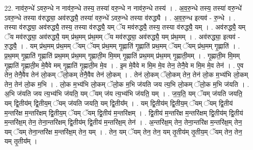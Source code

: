 \documentclass[17pt]{extarticle}
\begin{document}
22. नाव॑रु॒न्धे॑ ऽवरु॒न्धे न नाव॑रु॒न्धे तस्य॒ तस्या॑ वरु॒न्धे न नाव॑रु॒न्धे तस्य॑ । . अ॒व॒रु॒न्धे तस्य॒ तस्या॑ वरु॒न्धे॑ ऽवरु॒न्धे तस्या व॑रुद्ध्या॒ अव॑रुद्ध्यै॒ तस्या॑ वरु॒न्धे॑ ऽवरु॒न्धे तस्या व॑रुद्ध्यै । . अ॒व॒रु॒न्ध इत्यव॑ - रु॒न्धे । . तस्या व॑रुद्ध्या॒ अव॑रुद्ध्यै॒ तस्य॒ तस्या व॑रुद्ध्यै॒ यम् ॅय मव॑रुद्ध्यै॒ तस्य॒ तस्या व॑रुद्ध्यै॒ यम् । . अव॑रुद्ध्यै॒ यम् ॅय मव॑रुद्ध्या॒ अव॑रुद्ध्यै॒ यम् प्र॑थ॒मम् प्र॑थ॒मम् ॅय मव॑रुद्ध्या॒ अव॑रुद्ध्यै॒ यम् प्र॑थ॒मम् । . अव॑रुद्ध्या॒ इत्यव॑ - रु॒द्ध्यै॒ । . यम् प्र॑थ॒मम् प्र॑थ॒मम् ॅयम् ॅयम् प्र॑थ॒मम् गृ॒ह्णाति॑ गृ॒ह्णाति॑ प्रथ॒मम् ॅयम् ॅयम् प्र॑थ॒मम् गृ॒ह्णाति॑ । . प्र॒थ॒मम् गृ॒ह्णाति॑ गृ॒ह्णाति॑ प्रथ॒मम् प्र॑थ॒मम् गृ॒ह्णाती॒म मि॒मम् गृ॒ह्णाति॑ प्रथ॒मम् प्र॑थ॒मम् गृ॒ह्णाती॒मम् । . गृ॒ह्णाती॒म मि॒मम् गृ॒ह्णाति॑ गृ॒ह्णाती॒म मे॒वैवे मम् गृ॒ह्णाति॑ गृ॒ह्णाती॒म मे॒व । . इ॒म मे॒वैवे म मि॒म मे॒व तेन॒ तेनै॒वे म मि॒म मे॒व तेन॑ । . ए॒व तेन॒ तेनै॒वैव तेन॑ लो॒कम् ॅलो॒कम् तेनै॒वैव तेन॑ लो॒कम् । . तेन॑ लो॒कम् ॅलो॒कम् तेन॒ तेन॑ लो॒क म॒भ्य॑भि लो॒कम् तेन॒ तेन॑ लो॒क म॒भि । . लो॒क म॒भ्य॑भि लो॒कम् ॅलो॒क म॒भि ज॑यति जय त्य॒भि लो॒कम् ॅलो॒क म॒भि ज॑यति । . अ॒भि ज॑यति जय त्य॒भ्य॑भि ज॑यति॒ यम् ॅयम् ज॑य त्य॒भ्य॑भि ज॑यति॒ यम् । . ज॒य॒ति॒ यम् ॅयम् ज॑यति जयति॒ यम् द्वि॒तीय॑म् द्वि॒तीय॒म् ॅयम् ज॑यति जयति॒ यम् द्वि॒तीय᳚म् । . यम् द्वि॒तीय॑म् द्वि॒तीय॒म् ॅयम् ॅयम् द्वि॒तीय॑ म॒न्तरि॑क्ष म॒न्तरि॑क्षम् द्वि॒तीय॒म् ॅयम् ॅयम् द्वि॒तीय॑ म॒न्तरि॑क्षम् । . द्वि॒तीय॑ म॒न्तरि॑क्ष म॒न्तरि॑क्षम् द्वि॒तीय॑म् द्वि॒तीय॑ म॒न्तरि॑क्ष॒म् तेन॒ तेना॒न्तरि॑क्षम् द्वि॒तीय॑म् द्वि॒तीय॑ म॒न्तरि॑क्ष॒म् तेन॑ । . अ॒न्तरि॑क्ष॒म् तेन॒ तेना॒न्तरि॑क्ष म॒न्तरि॑क्ष॒म् तेन॒ यम् ॅयम् तेना॒न्तरि॑क्ष म॒न्तरि॑क्ष॒म् तेन॒ यम् । . तेन॒ यम् ॅयम् तेन॒ तेन॒ यम् तृ॒तीय॑म् तृ॒तीय॒म् ॅयम् तेन॒ तेन॒ यम् तृ॒तीय᳚म् । \newline
\end{document}
